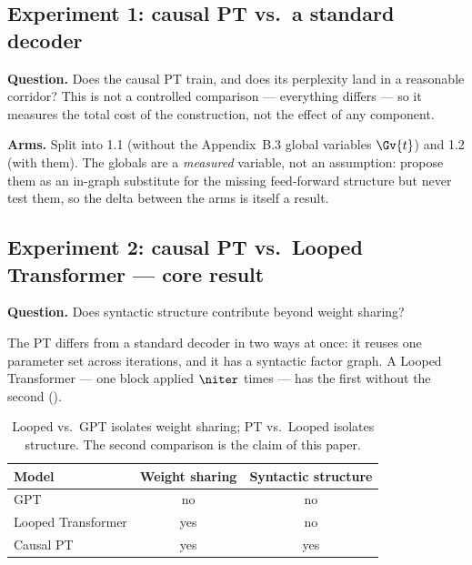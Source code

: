 
\subsection{Experiment 1: causal PT vs.\ a standard decoder}
\label{sec:exp1}

\textbf{Question.} Does the causal PT train, and does its perplexity land in a reasonable
corridor? This is not a controlled comparison --- everything differs --- so it measures the
total cost of the construction, not the effect of any component.

\textbf{Arms.} Split into 1.1 (without the Appendix~B.3 global variables $\Gv{t}$) and 1.2
(with them). The globals are a \emph{measured} variable, not an assumption: \citet{wu2023probabilistic}
propose them as an in-graph substitute for the missing feed-forward structure but never test
them, so the delta between the arms is itself a result.

 

\subsection{Experiment 2: causal PT vs.\ Looped Transformer --- core result}
\label{sec:exp2}

\textbf{Question.} Does syntactic structure contribute beyond weight sharing?

The PT differs from a standard decoder in two ways at once: it reuses one parameter set across
iterations, and it has a syntactic factor graph. A Looped Transformer --- one block applied
$\niter$ times --- has the first without the second ().

\begin{table}[t]
\centering
\begin{tabular}{lcc}
\toprule
Model & Weight sharing & Syntactic structure \\
\midrule
GPT                & no  & no  \\
Looped Transformer & yes & no  \\
Causal PT          & yes & yes \\
\bottomrule
\end{tabular}
\caption{Looped vs.\ GPT isolates weight sharing; PT vs.\ Looped isolates structure.
The second comparison is the claim of this paper.}
\label{tab:three-point}
\end{table}

